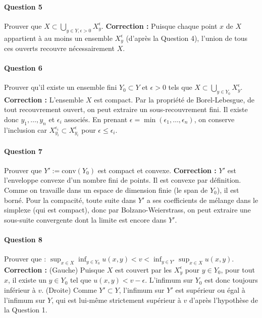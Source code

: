 \paragraph{Question 5} Prouver que $X \subset \bigcup_{y \in Y, \epsilon > 0} X_y^\epsilon$.
\textbf{Correction :} Puisque chaque point $x$ de $X$ appartient à au moins un ensemble $X_y^\epsilon$ (d'après la Question 4), l'union de tous ces ouverts recouvre nécessairement $X$.

\paragraph{Question 6} Prouver qu'il existe un ensemble fini $Y_0 \subset Y$ et $\epsilon > 0$ tels que $X \subset \bigcup_{y \in Y_0} X_y^\epsilon$.
\textbf{Correction :} L'ensemble $X$ est compact. Par la propriété de Borel-Lebesgue, de tout recouvrement ouvert, on peut extraire un sous-recouvrement fini. Il existe donc $y_1, \dots, y_n$ et $\epsilon_i$ associés. En prenant $\epsilon = \min(\epsilon_1, \dots, \epsilon_n)$, on conserve l'inclusion car $X_{y_i}^{\epsilon_i} \subset X_{y_i}^{\epsilon}$ pour $\epsilon \leq \epsilon_i$.

\paragraph{Question 7} Prouver que $Y' := \text{conv}(Y_0)$ est compact et convexe.
\textbf{Correction :} $Y'$ est l'enveloppe convexe d'un nombre fini de points. Il est convexe par définition. Comme on travaille dans un espace de dimension finie (le span de $Y_0$), il est borné. Pour la compacité, toute suite dans $Y'$ a ses coefficients de mélange dans le simplexe (qui est compact), donc par Bolzano-Weierstrass, on peut extraire une sous-suite convergente dont la limite est encore dans $Y'$.

\paragraph{Question 8} Prouver que : $\sup_{x \in X} \inf_{y \in Y_0} u(x,y) < v < \inf_{y \in Y'} \sup_{x \in X} u(x,y)$.
\textbf{Correction :}
(Gauche) Puisque $X$ est couvert par les $X_y^\epsilon$ pour $y \in Y_0$, pour tout $x$, il existe un $y \in Y_0$ tel que $u(x,y) < v - \epsilon$. L'infimum sur $Y_0$ est donc toujours inférieur à $v$.
(Droite) Comme $Y' \subset Y$, l'infimum sur $Y'$ est supérieur ou égal à l'infimum sur $Y$, qui est lui-même strictement supérieur à $v$ d'après l'hypothèse de la Question 1.


